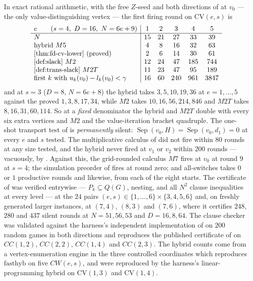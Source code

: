 \begin{proposition}[Measured]\label{prop:fd-cv-measured}
In exact rational arithmetic, with the free $Z$-seed and both directions of
 at $v_0$ --- the only value-distinguishing vertex ---
the first firing round on $\mathrm{CV}(e,s)$ is
\[
 \begin{array}{l|ccccc}
   e\qquad (s=4,\ D=16,\ N=6e+9) & 1&2&3&4&5\\\hline
   N                             & 15&21&27&33&39\\
   \text{hybrid }M5              & 4&8&16&32&63\\
   \Cref{thm:fd-cv-lower}\ \text{(proved)} & 2&6&14&30&61\\
   \Cref{def:slack}\ M2          & 12&24&47&185&744\\
   \Cref{def:trans-slack}\ M2T   & 11&23&47&95&189\\
   \text{first }k\text{ with }u_k(v_0)-l_k(v_0)<\gamma & 16&60&240&961&3847
 \end{array}
\]
and at $s=3$ ($D=8$, $N=6e+8$) the hybrid takes $3,5,10,19,36$ at
$e=1,\dots,5$ against the proved $1,3,8,17,34$, while $M2$ takes
$10,16,56,214,846$ and $M2T$ takes $8,16,31,60,114$. So at a \emph{fixed}
denominator the hybrid and $M2T$ double with every six extra vertices and $M2$
and the value-iteration bracket quadruple. The one-shot transport test of
 is \emph{permanently} silent:
$\operatorname{Sep}(v_0,H)=\operatorname{Sep}(v_0,d_1)=0$ at every $e$ and $s$
tested. The multiplicative calculus of  did not fire within
$80$ rounds at any size tested, and the hybrid never fired at $v_1$ or $v_2$
within $200$ rounds --- vacuously, by . Against this, the
grid-rounded calculus $M7$ fires at $v_0$ at round $9$ at $s=4$; the simulation
preorder of  fires at round zero; and all-switches takes $0$
or $1$ productive rounds and  likewise, from each of the eight
starts. The certificate of  was verified entrywise ---
$P_k\subseteq Q(G)$, nesting, and all $N^{2}$ clause inequalities at every
level --- at the $24$ pairs $(e,s)\in\{1,\dots,6\}\times\{3,4,5,6\}$ and, on
freshly generated larger instances, at $(7,4)$, $(8,3)$ and $(7,6)$, where it
certifies $248$, $280$ and $437$ silent rounds at $N=51,56,53$ and
$D=16,8,64$. The clause checker was validated against the harness's independent
implementation of  on $200$ random games in both directions and
reproduces the published certificate of  on $CC(1,2)$,
$CC(2,2)$, $CC(1,4)$ and $CC(2,3)$. The hybrid counts come from a
vertex-enumeration engine in the three controlled coordinates which reproduces
$\mathrm{fasthyb}$ on five $CW(e,s)$, and were reproduced by the harness's
linear-programming hybrid on $\mathrm{CV}(1,3)$ and $\mathrm{CV}(1,4)$.
\end{proposition}

